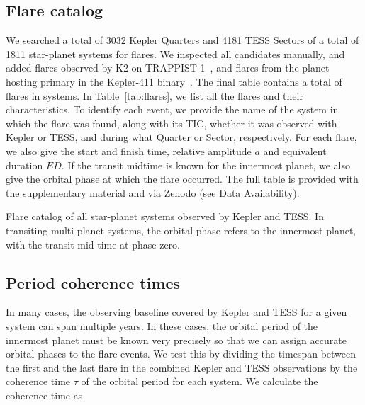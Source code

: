 \documentclass[twocolumn]{aastex631}
\begin{document}
\subsection{Flare catalog}
\label{sec:results:catalog}
We searched a total of 3032 Kepler Quarters and 4181 TESS Sectors of a total of 1811 star-planet systems for flares. We inspected all candidates manually, and added flares observed by K2 on TRAPPIST-1~\cite{paudel2018k2}, and flares from the planet hosting primary in the Kepler-411 binary~\cite{jackman2021stellara}. The final table contains a total of  flares in  systems. In Table~\ref{tab:flares}, we list all the flares and their characteristics. To identify each event, we provide the name of the system in which the flare was found, along with its TIC, whether it was observed with Kepler or TESS, and during what Quarter or Sector, respectively. For each flare, we also give the start and finish time, relative amplitude $a$ and equivalent duration $ED$. If the transit midtime is known for the innermost planet, we also give the orbital phase at which the flare occurred. The full table is provided with the supplementary material and via Zenodo (see Data Availability).

\begin{table*}
    \centering
            \caption{
            Flare catalog of all star-planet systems observed by Kepler and TESS. In transiting multi-planet systems, the orbital phase refers to the innermost planet, with the transit mid-time at phase zero. 
        }
    
        \label{tab:flares}
\end{table*}

\subsection{Period coherence times}
\label{sec:results:coherence}
In many cases, the observing baseline covered by Kepler and TESS for a given system can span multiple years. In these cases, the orbital period of the innermost planet must be known very precisely so that we can assign accurate orbital phases to the flare events.
We test this by dividing the timespan between the first and the last flare in the combined Kepler and TESS observations by the coherence time $\tau$ of the orbital period for each system. We calculate the coherence time as
\end{document}

